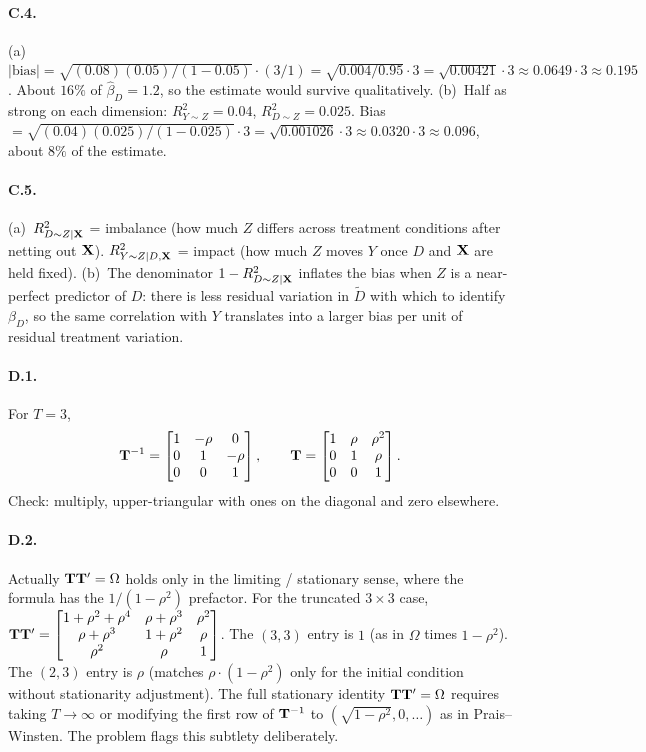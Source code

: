 \documentclass{article}
\begin{document}
\paragraph{C.4.}  (a)~$|\text{bias}| = \sqrt{(0.08)(0.05)/(1 - 0.05)}\cdot (3/1) = \sqrt{0.004/0.95}\cdot 3 = \sqrt{0.00421}\cdot 3 \approx 0.0649\cdot 3 \approx 0.195$.  About $16\%$ of $\hat\beta_D = 1.2$, so the estimate would survive qualitatively.  (b)~Half as strong on each dimension: $R^2_{Y\sim Z} = 0.04$, $R^2_{D\sim Z} = 0.025$.  Bias $= \sqrt{(0.04)(0.025)/(1 - 0.025)}\cdot 3 = \sqrt{0.001026}\cdot 3 \approx 0.0320\cdot 3 \approx 0.096$, about $8\%$ of the estimate.

\paragraph{C.5.}  (a)~$R^2_{D\sim Z\mid {\mathbf X}}$ = imbalance (how much $Z$ differs across treatment conditions after netting out ${\mathbf X}$).  $R^2_{Y\sim Z\mid D,{\mathbf X}}$ = impact (how much $Z$ moves $Y$ once $D$ and ${\mathbf X}$ are held fixed).  (b)~The denominator $1 - R^2_{D\sim Z\mid {\mathbf X}}$ inflates the bias when $Z$ is a near-perfect predictor of $D$: there is less residual variation in $\tilde D$ with which to identify $\beta_D$, so the same correlation with $Y$ translates into a larger bias per unit of residual treatment variation.

\bigskip

\paragraph{D.1.}  For $T = 3$,
$${\mathbf T}^{-1} = \begin{bmatrix}1 & -\rho & 0 \\ 0 & 1 & -\rho \\ 0 & 0 & 1\end{bmatrix},\qquad {\mathbf T} = \begin{bmatrix}1 & \rho & \rho^2 \\ 0 & 1 & \rho \\ 0 & 0 & 1\end{bmatrix}.$$
Check: multiply, upper-triangular with ones on the diagonal and zero elsewhere.

\paragraph{D.2.}  Actually ${\mathbf T}{\mathbf T}' = \Omega$ holds only in the limiting / stationary sense, where the formula has the $1/(1-\rho^2)$ prefactor.  For the truncated $3\times 3$ case, ${\mathbf T}{\mathbf T}' = \begin{bmatrix}1 + \rho^2 + \rho^4 & \rho + \rho^3 & \rho^2 \\ \rho + \rho^3 & 1 + \rho^2 & \rho \\ \rho^2 & \rho & 1\end{bmatrix}$.  The $(3,3)$ entry is $1$ (as in $\Omega$ times $1-\rho^2$).  The $(2,3)$ entry is $\rho$ (matches $\rho\cdot(1-\rho^2)$ only for the initial condition without stationarity adjustment).  The full stationary identity ${\mathbf T}{\mathbf T}' = \Omega$ requires taking $T\to\infty$ or modifying the first row of ${\mathbf T}^{-1}$ to $(\sqrt{1-\rho^2}, 0, \ldots)$ as in Prais--Winsten.  The problem flags this subtlety deliberately.
\end{document}

